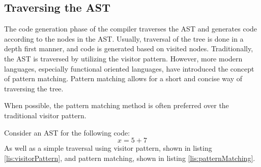 
\subsection{Traversing the AST}
The code generation phase of the compiler traverses the AST and generates code according to the nodes in the AST.
Usually, traversal of the tree is done in a depth first manner, and code is generated based on visited nodes.
Traditionally, the AST is traversed by utilizing the visitor pattern. 
However, more modern languages, especially functional oriented languages, have introduced the concept of pattern matching.
Pattern matching allows for a short and concise way of traversing the tree.

When possible, the pattern matching method is often preferred over the traditional visitor pattern. 

Consider an AST for the following code:
$$x = 5 + 7$$
As well as a simple traversal using visitor pattern, shown in listing \ref{lis:visitorPattern}, and pattern matching, shown in listing \ref{lis:patternMatching}.

